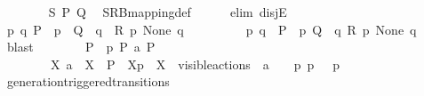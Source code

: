 \begin{isabellebody}
\ \ \ \ \ \ \isamarkupfalse%
\ {\isacartoucheopen}{\isacharquery}{\kern0pt}S\ P\ Q{\isacartoucheclose}\ \isamarkupfalse%
\ SRB{\isacharunderscore}{\kern0pt}mapping{\isacharunderscore}{\kern0pt}def\isanewline
\ \ \ \ \isamarkupfalse%
\ {\isacharparenleft}{\kern0pt}elim\ disjE{\isacharparenright}{\kern0pt}\isanewline
\ \ \ \ \ \ \isamarkupfalse%
\ {\isacartoucheopen}{\isasymexists}p\ q{\isachardot}{\kern0pt}\ P\ {\isacharequal}{\kern0pt}\ {\isasymtheta}{\isacharparenleft}{\kern0pt}p{\isacharparenright}{\kern0pt}\ {\isasymand}\ Q\ {\isacharequal}{\kern0pt}\ {\isasymtheta}{\isacharparenleft}{\kern0pt}q{\isacharparenright}{\kern0pt}\ {\isasymand}\ R\ p\ None\ q{\isacartoucheclose}\isanewline
\ \ \ \ \ \ \isamarkupfalse%
\ \isamarkupfalse%
\ p\ q\ \ {\isacartoucheopen}P\ {\isacharequal}{\kern0pt}\ {\isasymtheta}{\isacharparenleft}{\kern0pt}p{\isacharparenright}{\kern0pt}{\isacartoucheclose}\ {\isacartoucheopen}Q\ {\isacharequal}{\kern0pt}\ {\isasymtheta}{\isacharparenleft}{\kern0pt}q{\isacharparenright}{\kern0pt}{\isacartoucheclose}\ {\isacartoucheopen}R\ p\ None\ q{\isacartoucheclose}\ \isamarkupfalse%
\ blast\isanewline
\ \ \ \ \ \ \isamarkupfalse%
\ {\isacartoucheopen}P\ {\isacharequal}{\kern0pt}\ {\isasymtheta}{\isacharparenleft}{\kern0pt}p{\isacharparenright}{\kern0pt}{\isacartoucheclose}\ {\isacartoucheopen}P\ {\isasymlongmapsto}\isactrlsup {\isasymtheta}a\ P{\isacharprime}{\kern0pt}{\isacartoucheclose}\ \isamarkupfalse%
\isanewline
\ \ \ \ \ \ \ \ {\isacartoucheopen}{\isacharparenleft}{\kern0pt}{\isasymexists}X{\isachardot}{\kern0pt}\ a\ {\isacharequal}{\kern0pt}\ {\isasymepsilon}{\isacharbrackleft}{\kern0pt}X{\isacharbrackright}{\kern0pt}\ {\isasymand}\ P{\isacharprime}{\kern0pt}\ {\isacharequal}{\kern0pt}\ {\isasymtheta}{\isacharbrackleft}{\kern0pt}X{\isacharbrackright}{\kern0pt}{\isacharparenleft}{\kern0pt}p{\isacharparenright}{\kern0pt}\ {\isasymand}\ X\ {\isasymsubseteq}\ visible{\isacharunderscore}{\kern0pt}actions{\isacharparenright}{\kern0pt}\ {\isasymor}\ a\ {\isacharequal}{\kern0pt}\ {\isasymtau}\ {\isasymand}\ {\isacharparenleft}{\kern0pt}{\isasymexists}p{\isacharprime}{\kern0pt}{\isachardot}{\kern0pt}\ p\ {\isasymlongmapsto}{\isasymtau}\ \ p{\isacharprime}{\kern0pt}{\isacharparenright}{\kern0pt}{\isacartoucheclose}\isanewline
\ \ \ \ \ \ \ \ \isamarkupfalse%
\ generation{\isacharunderscore}{\kern0pt}triggered{\isacharunderscore}{\kern0pt}transitions\ \isamarkupfalse%

\end{isabellebody}
